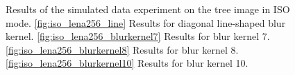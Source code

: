 \documentclass[12pt,notitlepage]{report}
\begin{document}
\clearpage

\begin{figure}[htb]
  \centering

  \caption[Results for the tree image in ISO mode]{Results of the simulated data experiment on the tree image in ISO mode. \ref{fig:iso_lena256_line} Results for diagonal line-shaped blur kernel. \ref{fig:iso_lena256_blurkernel7} Results for blur kernel 7. \ref{fig:iso_lena256_blurkernel8} Results for blur kernel 8. \ref{fig:iso_lena256_blurkernel10} Results for blur kernel 10.}
  \label{fig:iso_tree256}
\end{figure}
\end{document}
